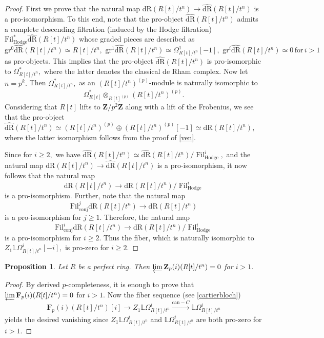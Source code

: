 \documentclass[10pt,letterpaper]{amsart}
\numberwithin{figure}{section}
\numberwithin{equation}{section}
\newtheorem{proposition}[figure]{Proposition}
\theoremstyle{definition}
\theoremstyle{definition}
\theoremstyle{definition}
\theoremstyle{definition}
\DeclareMathOperator{\Fil}{Fil}
\newcommand{\LL}{\L}
\renewcommand{\L}{\mathbb{L}}
\newcommand{\Z}{\mathbf{Z}}
\newcommand{\F}{\mathbf{F}}
\begin{document}
\begin{proof}
    First we prove that the natural map $\mathrm{dR}(R[t]/t^n) \to \widehat{\mathrm{dR}}(R[t]/t^n)$ is a pro-isomorphism. To this end, note that the pro-object $ \widehat{\mathrm{dR}}(R[t]/t^n)$ admits a complete descending filtration (induced by the Hodge filtration) $\mathrm{Fil}^*_{\mathrm{Hodge}}\widehat{\mathrm{dR}}(R[t]/t^n)$ whose graded pieces are described as 
$$ \mathrm{gr}^0 \widehat{\mathrm{dR}}(R[t]/t^n) \simeq R[t]/t^n,\,\, \mathrm{gr}^1 \widehat{\mathrm{dR}}(R[t]/t^n) \simeq \Omega^1_{R[t]/t^n}[-1],\,\, \mathrm{gr}^i\widehat{\mathrm{dR}}(R[t]/t^n) \simeq 0\, \text{for}\, i >1$$ as pro-objects. This implies that the pro-object $\widehat{\mathrm{dR}}(R[t]/t^n)$ is pro-isomorphic to $\Omega^*_{R[t]/t^n},$ where the latter denotes the classical de Rham complex. Now let $n= p^k.$ Then $\Omega^*_{R[t]/t^n},$ as an $(R[t]/ t^n)^{(p)}$-module is naturally isomorphic to $$\Omega^*_{R[t]} \otimes_{R[t]^{(p)}} (R[t]/ t^n)^{(p)}.$$ Considering that $R[t]$ lifts to $\Z/p^2 \Z$ along with a lift of the Frobenius, we see that the pro-object $\widehat{\mathrm{dR}}(R[t]/t^n) \simeq(R[t]/t^n)^{(p)} \oplus (R[t]/t^n)^{(p)}[-1] \simeq \mathrm{dR}(R[t]/t^n),$ where the latter isomorphism follows from the proof of \cref{ven}.

Since for $i \ge 2,$ we have $\widehat{\mathrm{dR}}(R[t]/t^n) \simeq \widehat{\mathrm{dR}}(R[t]/t^n)/ \Fil^i_{\mathrm{Hodge}},$ and the natural map $\mathrm{dR}(R[t]/t^n) \to \widehat{\mathrm{dR}}(R[t]/t^n)$ is a pro-isomorphism, it now follows that the natural map $$\mathrm{dR}(R[t]/t^n) \to \mathrm{dR}(R[t]/t^n)/ \Fil^i_{\mathrm{Hodge}}$$ is a pro-isomorphism. Further, note that the natural map $$\mathrm{Fil}^j_{\mathrm{conj}} \mathrm{dR}(R[t]/t^n) \to \mathrm{dR}(R[t]/t^n)$$ is a pro-isomorphism for $j \ge 1.$ Therefore, the natural map $$\mathrm{Fil}^i_{\mathrm{conj}} \mathrm{dR}(R[t]/t^n) \to \mathrm{dR}(R[t]/t^n)/ \Fil^i_{\mathrm{Hodge}}$$ is a pro-isomorphism for $i \ge 2.$ Thus the fiber, which is naturally isomorphic to $Z_1\LL \Omega^i_{R[t]/t^n}[-i],$ is pro-zero for $i \ge 2$.
\end{proof}{}


\begin{proposition}
    Let $R$ be a perfect ring. Then $\varprojlim \Z_p(i) (R[t]/t^n) = 0$ for $i>1.$
\end{proposition}{}


\begin{proof}
    By derived $p$-completeness, it is enough to prove that  $\varprojlim \F_p(i) (R[t]/t^n) = 0$ for $i>1.$ Now the fiber sequence (see \cref{cartierbloch}) $$ \F_p(i)(R[t]/t^n)[i] \to Z_1 \LL \Omega^i_{R[t]/t^n} \xrightarrow[]{\mathrm{can} - C} \LL\Omega^i_{R[t]/t^n}$$ yields the desired vanishing since $Z_1 \LL \Omega^i_{R[t]/t^n}$ and $\LL\Omega^i_{R[t]/t^n}$ are both pro-zero for $i>1.$
\end{proof}{}
\end{document}
